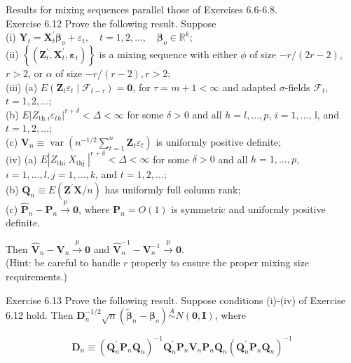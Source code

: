 \documentclass[10pt]{article}
\begin{document}
Results for mixing sequences parallel those of Exercises 6.6-6.8.\\
Exercise 6.12 Prove the following result. Suppose\\
(i) $\mathbf{Y}_{t}=\mathbf{X}_{t}^{\prime} \boldsymbol{\beta}_{o}+\varepsilon_{t}, \quad t=1,2, \ldots, \quad \boldsymbol{\beta}_{o} \in \mathbb{R}^{k}$;\\
(ii) $\left\{\left(\mathbf{Z}_{t}^{\prime}, \mathbf{X}_{t}^{\prime}, \boldsymbol{\varepsilon}_{t}\right)\right\}$ is a mixing sequence with either $\phi$ of size $-r /(2 r-2)$, $r>2$, or $\alpha$ of size $-r /(r-2), r>2$;\\
(iii) (a) $E\left(\mathbf{Z}_{t} \varepsilon_{t} \mid \mathcal{F}_{t-\tau}\right)=\mathbf{0}$, for $\tau=m+1<\infty$ and adapted $\sigma$-fields $\mathcal{F}_{t}$, $t=1,2, \ldots$;\\
(b) $E\left|Z_{\text {th } i} \varepsilon_{t h}\right|^{r+\delta}<\Delta<\infty$ for some $\delta>0$ and all $h=l, \ldots, p$, $i=1, \ldots$, l, and $t=1,2, \ldots$;\\
(c) $\mathbf{V}_{n} \equiv \operatorname{var}\left(n^{-1 / 2} \sum_{t=1}^{n} \mathbf{Z}_{t} \varepsilon_{t}\right)$ is uniformly positive definite;\\
(iv) (a) $E\left|Z_{\text {thi }} X_{\text {thj }}\right|^{r+\delta}<\Delta<\infty$ for some $\delta>0$ and all $h=1, \ldots, p$, $i=1, \ldots, l, j=1, \ldots, k$, and $t=1,2, \ldots$;\\
(b) $\mathbf{Q}_{n} \equiv E\left(\mathbf{Z}^{\prime} \mathbf{X} / n\right)$ has uniformly full column rank;\\
(c) $\hat{\mathbf{P}}_{n}-\mathbf{P}_{n} \xrightarrow{p} \mathbf{0}$, where $\mathbf{P}_{n}=O(1)$ is symmetric and uniformly positive definite.

Then $\hat{\mathbf{V}}_{n}-\mathbf{V}_{n} \xrightarrow{p} \mathbf{0}$ and $\hat{\mathbf{V}}_{n}^{-1}-\mathbf{V}_{n}^{-1} \xrightarrow{p} \mathbf{0}$.\\
(Hint: be careful to handle $r$ properly to ensure the proper mixing size requirements.)

Exercise 6.13 Prove the following result. Suppose conditions (i)-(iv) of Exercise 6.12 hold. Then $\mathbf{D}_{n}^{-1 / 2} \sqrt{n}\left(\tilde{\boldsymbol{\beta}}_{n}-\boldsymbol{\beta}_{o}\right) \stackrel{A}{\sim} N(\mathbf{0}, \mathbf{I})$, where

$$
\mathbf{D}_{n} \equiv\left(\mathbf{Q}_{n}^{\prime} \mathbf{P}_{n} \mathbf{Q}_{n}\right)^{-1} \mathbf{Q}_{n}^{\prime} \mathbf{P}_{n} \mathbf{V}_{n} \mathbf{P}_{n} \mathbf{Q}_{n}\left(\mathbf{Q}_{n}^{\prime} \mathbf{P}_{n} \mathbf{Q}_{n}\right)^{-1}
$$
\end{document}
